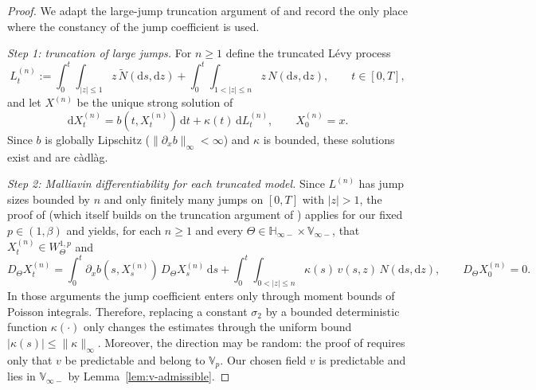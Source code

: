 \documentclass[11pt]{article}
\newcommand{\Hb}{\mathbb{H}}
\newcommand{\Vb}{\mathbb{V}}
\newcommand{\1}{\mathbf{1}}
\newcommand{\dd}{\mathrm{d}}
\newcommand{\dt}{\,\dd t}
\theoremstyle{plain}
\theoremstyle{definition}
\theoremstyle{remark}
\begin{document}
\begin{proof}
We adapt the large-jump truncation argument of \cite[Section~5]{NakagawaSuzuki2024} and record the only place where the constancy of the jump coefficient is used.

\medskip
\noindent\emph{Step 1: truncation of large jumps.}
For $n\ge1$ define the truncated L\'evy process
\[
L^{(n)}_t:=\int_0^t\int_{|z|\le1} z\,\tilde N(\dd s,\dd z)+\int_0^t\int_{1<|z|\le n} z\,N(\dd s,\dd z),
\qquad t\in[0,T],
\]
and let $X^{(n)}$ be the unique strong solution of
\begin{equation}\label{eq:SDE-jump-trunc}
\dd X^{(n)}_t=b(t,X^{(n)}_t)\dt+\kappa(t)\,\dd L^{(n)}_t,\qquad X^{(n)}_0=x.
\end{equation}
Since $b$ is globally Lipschitz ($\|\partial_x b\|_\infty<\infty$) and $\kappa$ is bounded, these solutions exist and are c\`adl\`ag.

\medskip
\noindent\emph{Step 2: Malliavin differentiability for each truncated model.}
Since $L^{(n)}$ has jump sizes bounded by $n$ and only finitely many jumps on $[0,T]$ with $|z|>1$,
the proof of \cite[Lemma~5.1]{NakagawaSuzuki2024} (which itself builds on the truncation argument of \cite[Lemma~4.3]{SongXie2018}) applies for our fixed $p\in(1,\beta)$ and yields,
for each $n\ge1$ and every $\Theta\in \Hb_{\infty-}\times \Vb_{\infty-}$,
that $X^{(n)}_t\in W^{1,p}_\Theta$ and
\begin{equation}\label{eq:DXjump-n}
D_\Theta X^{(n)}_t
=\int_0^t \partial_x b(s,X^{(n)}_s)\,D_\Theta X^{(n)}_s\,\dd s
+\int_0^t\int_{0<|z|\le n}\kappa(s)\,v(s,z)\,N(\dd s,\dd z),\qquad D_\Theta X^{(n)}_0=0.
\end{equation}
In those arguments the jump coefficient enters only through moment bounds of Poisson integrals.
Therefore, replacing a constant $\sigma_2$ by a bounded deterministic function $\kappa(\cdot)$ only changes the estimates through the uniform bound $|\kappa(s)|\le\|\kappa\|_\infty$.
Moreover, the direction may be random: the proof of \cite[Lemma~5.1]{NakagawaSuzuki2024} requires only that $v$ be predictable and belong to $\Vb_p$.
Our chosen field $v$ is predictable and lies in $\Vb_{\infty-}$ by Lemma~\ref{lem:v-admissible}.


\end{proof}
\end{document}
